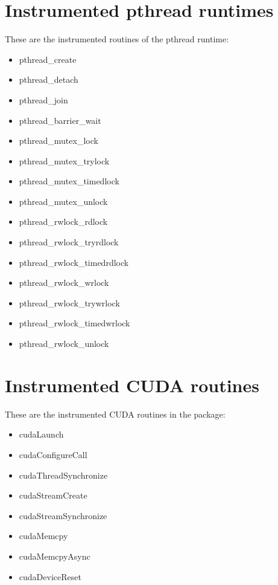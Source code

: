 \section{Instrumented pthread runtimes}\label{sec:OpenMPruntimesinstrumented}

These are the instrumented routines of the pthread runtime:

\begin{itemize}
\item pthread\_create
\item pthread\_detach
\item pthread\_join
\item pthread\_barrier\_wait
\item pthread\_mutex\_lock
\item pthread\_mutex\_trylock
\item pthread\_mutex\_timedlock
\item pthread\_mutex\_unlock
\item pthread\_rwlock\_rdlock
\item pthread\_rwlock\_tryrdlock
\item pthread\_rwlock\_timedrdlock
\item pthread\_rwlock\_wrlock
\item pthread\_rwlock\_trywrlock
\item pthread\_rwlock\_timedwrlock
\item pthread\_rwlock\_unlock
\end{itemize}

\section{Instrumented CUDA routines}\label{sec:CUDAinstrumentedroutines}

These are the instrumented CUDA routines in the \TRACE package:

\begin{itemize}
\item cudaLaunch
\item cudaConfigureCall
\item	cudaThreadSynchronize
\item	cudaStreamCreate
\item	cudaStreamSynchronize
\item	cudaMemcpy
\item	cudaMemcpyAsync
\item	cudaDeviceReset
\end{itemize}

